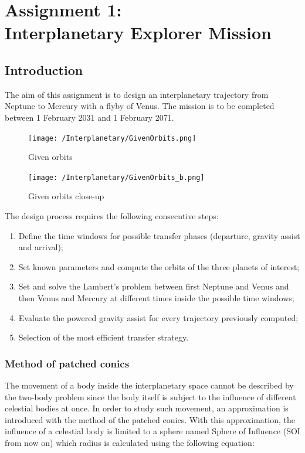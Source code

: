 \documentclass[11pt,a4paper]{report}
\begin{document}
\printnomenclature
\tableofcontents

\chapter{Assignment 1:\\ Interplanetary Explorer Mission}

\section{Introduction}
The aim of this assignment is to design an interplanetary trajectory from Neptune to Mercury with a flyby of Venus. The mission is to be completed between 1 February 2031 and 1 February 2071.\\

\begin{figure}[H]
\centering
\texttt{[image: /Interplanetary/GivenOrbits.png]}
\caption{Given orbits}
\end{figure}

\begin{figure}[H]
\centering
\texttt{[image: /Interplanetary/GivenOrbits\_b.png]}
\caption{Given orbits close-up}
\end{figure}

The design process requires the following consecutive steps:\\
\begin{enumerate}
\item Define the time windows for possible transfer phases (departure, gravity assist and arrival);
\item Set known parameters and compute the orbits of the three planets of interest;
\item Set and solve the Lambert’s problem between first Neptune and Venus and then Venus and Mercury at different times inside the possible time windows;
\item Evaluate the powered gravity assist for every trajectory previously computed;
\item Selection of the most efficient transfer strategy.
\end{enumerate}

\subsection{Method of patched conics}
The movement of a body inside the interplanetary space cannot be described by the two-body problem since the body itself is subject to the influence of different celestial bodies at once.
In order to study such movement, an approximation is introduced with the method of the patched conics. With this approximation, the influence of a celestial body is limited to a sphere named Sphere of Influence (SOI from now on) which radius is calculated using the following equation:
\end{document}
